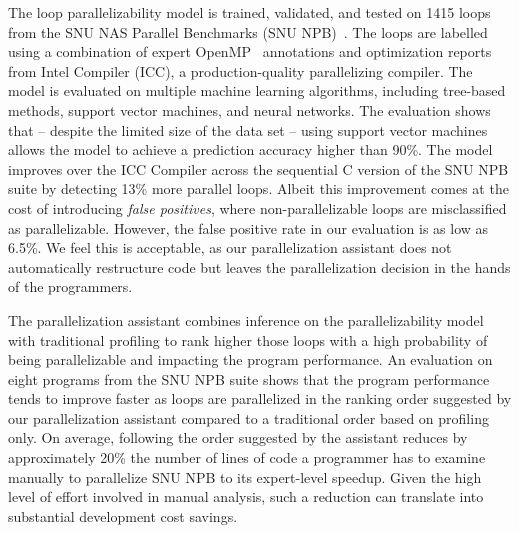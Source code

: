 The loop parallelizability model is trained, validated, and tested on 1415 loops
from the SNU NAS Parallel Benchmarks (SNU
NPB)~\cite{Seo:2011:PCN:2357490.2358063}.
%
The loops are labelled using a combination of expert OpenMP~\cite{Dagum:1998:OIA:615255.615542}
annotations and optimization reports from Intel \cpp{} Compiler (ICC), a
production-quality parallelizing compiler.
%
The model is evaluated on multiple machine learning algorithms, including tree-based methods, support vector machines, and neural networks.
%
The evaluation shows that -- despite the limited size of the data set -- using
support vector machines allows the model to achieve a prediction accuracy higher than 90\%.
%
%
The model improves over the ICC Compiler across the sequential C version of the SNU NPB suite by detecting 13\% more parallel loops. Albeit this improvement comes at the cost of introducing \textit{false positives}, where non-parallelizable loops are misclassified as parallelizable. However, the false positive rate in our evaluation is as low as 6.5\%. We feel this is acceptable, as our parallelization assistant does not automatically restructure code but leaves the parallelization decision in the hands of the programmers.


The parallelization assistant combines inference on the parallelizability model
with traditional profiling to rank higher those loops with a high probability of being parallelizable and impacting the program performance.
%
An evaluation on eight programs from the SNU NPB suite shows that
the program performance tends to improve faster as loops are parallelized in the ranking order suggested by our parallelization assistant compared to a traditional order based on profiling only.
%
On average, following the order suggested by the assistant reduces by approximately 20\% the number of lines of code a programmer has to examine manually to parallelize SNU NPB to its expert-level speedup.
%
Given the high level of effort involved in manual analysis, such a reduction
can translate into substantial development cost savings.

